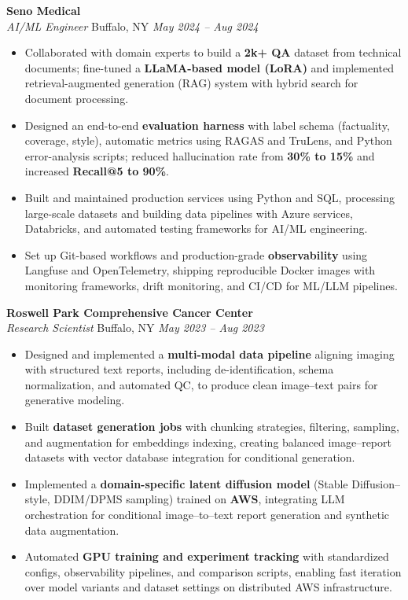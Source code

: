 \vspace*{-1pt}
\item \textbf{Seno Medical}\\
\textit{AI/ML Engineer} \hfill Buffalo, NY \quad \textit{May 2024 -- Aug 2024}
\vspace*{-3pt}
\begin{itemize}[leftmargin=0.2in, topsep=1pt]
  \item Collaborated with domain experts to build a \textbf{2k+ QA} dataset from technical documents; fine-tuned a \textbf{LLaMA-based model (LoRA)} and implemented retrieval-augmented generation (RAG) system with hybrid search for document processing.
  \item Designed an end-to-end \textbf{evaluation harness} with label schema (factuality, coverage, style), automatic metrics using RAGAS and TruLens, and Python error-analysis scripts; reduced hallucination rate from \textbf{30\% to 15\%} and increased \textbf{Recall@5 to 90\%}.
  \item Built and maintained production services using Python and SQL, processing large-scale datasets and building data pipelines with Azure services, Databricks, and automated testing frameworks for AI/ML engineering.
  \item Set up Git-based workflows and production-grade \textbf{observability} using Langfuse and OpenTelemetry, shipping reproducible Docker images with monitoring frameworks, drift monitoring, and CI/CD for ML/LLM pipelines.
\end{itemize}

\vspace*{-1pt}
\item \textbf{Roswell Park Comprehensive Cancer Center}\\
\textit{Research Scientist} \hfill Buffalo, NY \quad \textit{May 2023 -- Aug 2023}
\vspace*{-3pt}
\begin{itemize}[leftmargin=0.2in, topsep=1pt]
  \item Designed and implemented a \textbf{multi-modal data pipeline} aligning imaging with structured text reports, including de-identification, schema normalization, and automated QC, to produce clean image–text pairs for generative modeling.
  \item Built \textbf{dataset generation jobs} with chunking strategies, filtering, sampling, and augmentation for embeddings indexing, creating balanced image–report datasets with vector database integration for conditional generation.
  \item Implemented a \textbf{domain-specific latent diffusion model} (Stable Diffusion–style, DDIM/DPMS sampling) trained on \textbf{AWS}, integrating LLM orchestration for conditional image–to–text report generation and synthetic data augmentation.
  \item Automated \textbf{GPU training and experiment tracking} with standardized configs, observability pipelines, and comparison scripts, enabling fast iteration over model variants and dataset settings on distributed AWS infrastructure.
\end{itemize}
